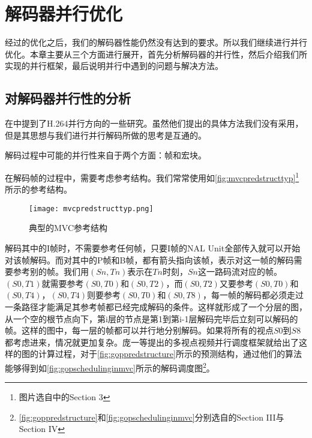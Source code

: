 

\chapter{解码器并行优化}
\label{cha:parallelopt}

经过的优化之后，我们的解码器性能仍然没有达到的要求。所以我们继续进行并行优化。本章主要从三个方面进行展开，首先分析解码器的并行性，然后介绍我们所实现的并行框架，最后说明并行中遇到的问题与解决方法。

\section{对解码器并行性的分析}
\label{sec:parallelpossibility}

在中提到了H.264并行方向的一些研究\cite{li2005design,seitner2007macroblock,mesa2009scalability,yang2006parallel,ugur2007parallel}。虽然他们提出的具体方法我们没有采用，但是其思想与我们进行并行解码所做的思考是互通的。

解码过程中可能的并行性来自于两个方面：帧和宏块。

在解码帧的过程中，需要考虑参考结构。我们常常使用如\autoref{fig:mvcpredstructtyp}\footnote{图片选自中的Section 3}所示的参考结构。

\begin{figure}[htbp]
\begin{center}
\texttt{[image: mvcpredstructtyp.png]}
\caption{典型的MVC参考结构}
\label{fig:mvcpredstructtyp}
\end{center}
\end{figure}

解码其中的I帧时，不需要参考任何帧，只要I帧的NAL Unit全部传入就可以开始对该帧解码。而对其中的P帧和B帧，都有箭头指向该帧，表示对这一帧的解码需要参考别的帧。我们用$(Sn,Tn)$表示在$Tn$时刻，$Sn$这一路码流对应的帧。$(S0,T1)$就需要参考$(S0,T0)$和$(S0,T2)$，而$(S0,T2)$又要参考$(S0,T0)$和$(S0,T4)$，$(S0,T4)$则要参考$(S0,T0)$和$(S0,T8)$，每一帧的解码都必须走过一条路径才能满足其参考帧都已经完成解码的条件。这样就形成了一个分层的图，从一个空的根节点向下，第i层的节点是第1到第i-1层解码完毕后立刻可以解码的帧。这样的图中，每一层的帧都可以并行地分别解码。如果将所有的视点$S0$到$S8$都考虑进来，情况就更加复杂。庞一等提出的多视点视频并行调度框架\cite{pang2009framework}就给出了这样的图的计算过程，对于\autoref{fig:goppredstructure}所示的预测结构，通过他们的算法能够得到如\autoref{fig:gopschedulinginmvc}所示的解码调度图\footnote{\autoref{fig:goppredstructure}和\autoref{fig:gopschedulinginmvc}分别选自的Section III与Section IV}。

